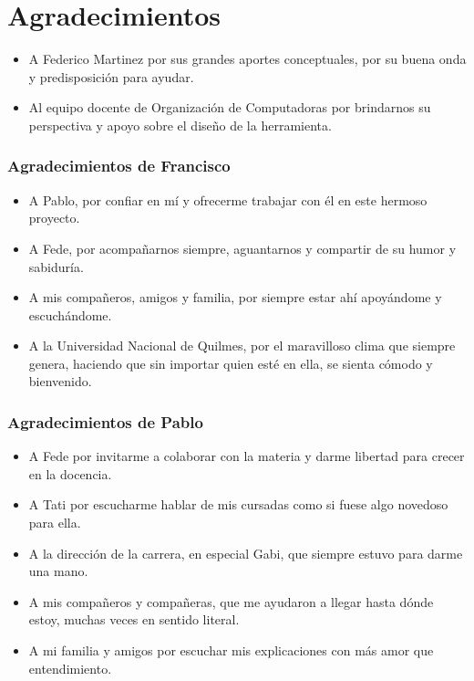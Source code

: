 \part*{Agradecimientos}
\begin{itemize}
  \item A Federico Martinez por sus grandes aportes conceptuales, por su buena onda y predisposición para ayudar.
  \item Al equipo docente de Organización de Computadoras por brindarnos su perspectiva y apoyo sobre el diseño de la herramienta. 
\end{itemize}

\section*{Agradecimientos de Francisco}
\begin{itemize}
  \item A Pablo, por confiar en mí y ofrecerme trabajar con él en este hermoso proyecto.
  \item A Fede, por acompañarnos siempre, aguantarnos y compartir de su humor y sabiduría.
  \item A mis compañeros, amigos y familia, por siempre estar ahí apoyándome y escuchándome.
  \item A la Universidad Nacional de Quilmes, por el maravilloso clima que siempre genera, haciendo que sin importar quien esté en ella, se sienta cómodo y bienvenido.
\end{itemize}

\section*{Agradecimientos de Pablo}
\begin{itemize}
  \item A Fede por invitarme a colaborar con la materia y darme libertad para crecer en la docencia.
  \item A Tati por escucharme hablar de mis cursadas como si fuese algo novedoso para ella.
  \item A la dirección de la carrera, en especial Gabi, que siempre estuvo para darme una mano.
  \item A mis compañeros y compañeras, que me ayudaron a llegar hasta dónde estoy, muchas veces en sentido literal.
  \item A mi familia y amigos por escuchar mis explicaciones con más amor que entendimiento.
\end{itemize}